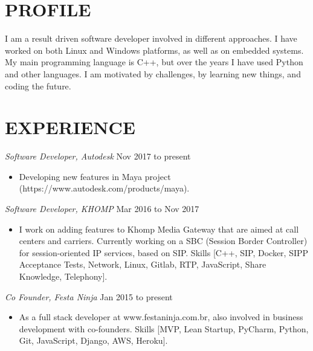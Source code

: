 \documentclass[line,margin]{res}
\begin{document}
\address{alvarofleith@gmail.com or +55 (48) 98458-9879}
\address{https://linkedin.com/in/alvarofleith}


\begin{resume}

\section{PROFILE}       I am a result driven software developer involved in different approaches. I have worked on both Linux and Windows platforms, as well as on embedded systems. My main programming language is C++, but over the years I have used Python and other languages. I am motivated by challenges, by learning new things, and coding the future.


 \section{EXPERIENCE} {\sl Software Developer, Autodesk} \hfill Nov 2017 to present \\
                 \begin{itemize}  \itemsep -2pt
                 \item Developing new features in Maya project (https://www.autodesk.com/products/maya).
                \end{itemize}
 
                {\sl Software Developer, KHOMP} \hfill Mar 2016 to Nov 2017 \\
                 \begin{itemize}  \itemsep -2pt
                 \item I work on adding features to Khomp Media Gateway that are aimed at call centers and carriers. Currently working on a SBC (Session Border Controller) for session-oriented IP services, based on SIP. Skills [C++, SIP, Docker, SIPP Acceptance Tests, Network, Linux, Gitlab, RTP, JavaScript, Share Knowledge, Telephony].
                \end{itemize}

                {\sl Co Founder, Festa Ninja} \hfill Jan 2015 to present \\
                 \begin{itemize}  \itemsep -2pt
                 \item As a full stack developer at www.festaninja.com.br, also involved in business development with co-founders. Skills [MVP, Lean Startup, PyCharm, Python, Git, JavaScript, Django, AWS, Heroku].
                 \end{itemize}


\end{resume}
\end{document}
